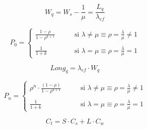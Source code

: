 \documentclass{templateNote}
\newcommand{\newparagraph}{\par\vspace{\baselineskip}\noindent}
\begin{document}
\begin{tcolorbox}[
    colframe=black!100, %
    colback=white!100,       %
    coltitle=white!100, %
    title=\textbf{M/M/1/K}, %
]
\begin{minipage}{0.2\textwidth}
\begin{equation*}
        \end{equation*}
    \end{minipage}
    \newparagraph
    \begin{minipage}{0.3\textwidth}
        \begin{equation*}
            W_q = W_s - \frac{1}{\mu} = \frac{L_q}{\lambda_{ef}}
        \end{equation*}
    \end{minipage}
    \hfill
    \begin{minipage}{0.6\textwidth}
        \begin{equation*}
            P_0 = \begin{cases}
                \displaystyle \frac{1 - \rho}{1 - \rho^{k + 1}} & \qquad \text{si } \lambda \neq \mu \equiv \rho = \frac{\lambda}{\mu} \neq 1 \\
                \\
                \displaystyle \frac{1}{1 + k} & \qquad \text{si } \lambda = \mu \equiv \rho = \frac{\lambda}{\mu} = 1
            \end{cases}
        \end{equation*}
    \end{minipage}
    \newparagraph
    \begin{minipage}{0.3\textwidth}
        \begin{equation*}
            Long_q = \lambda_{ef} \cdot W_q
        \end{equation*}
    \end{minipage}
    \hfill
    \begin{minipage}{0.6\textwidth}
        \begin{equation*}
            P_n = \begin{cases}
                \displaystyle \rho^n \cdot \frac{(1 - \rho)}{1 - \rho^{k + 1}} & \qquad \text{si } \lambda \neq \mu \equiv \rho = \frac{\lambda}{\mu} \neq 1 \\
                \\
                \displaystyle \frac{1}{1 + k} & \qquad \text{si } \lambda = \mu \equiv \rho = \frac{\lambda}{\mu} = 1
            \end{cases}
        \end{equation*}
    \end{minipage}
\end{tcolorbox}
\begin{tcolorbox}[
    colframe=black!100, %
    colback=white!100,       %
    coltitle=white!100, %
    title=\textbf{Costos en los sistemas de colas}, %
]
    \begin{equation*}
        C_t = S \cdot C_s + L \cdot C_w
    \end{equation*}
\end{tcolorbox}
\end{document}
